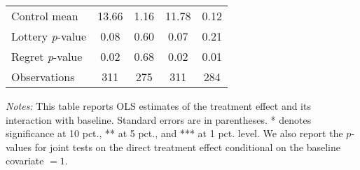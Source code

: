 \begin{table}[htbp]
{\begin{threeparttable}
\begin{tabular}{l*{4}{c}}
Control mean    &    13.66         &     1.16         &    11.78         &     0.12         \\
Lottery \emph{p}-value&     0.08         &     0.60         &     0.07         &     0.21         \\
Regret \emph{p}-value&     0.02         &     0.68         &     0.02         &     0.01         \\
Observations    &      311         &      275         &      311         &      284         \\
\bottomrule \end{tabular} \begin{tablenotes}[flushleft] \footnotesize \item \emph{Notes:} This table reports OLS estimates of the treatment effect and its interaction with baseline. Standard errors are in parentheses. * denotes significance at 10 pct., ** at 5 pct., and *** at 1 pct. level. We also report the \(p\)-values for joint tests on the direct treatment effect conditional on the baseline covariate $= 1$. \end{tablenotes} \end{threeparttable} } \end{table}

